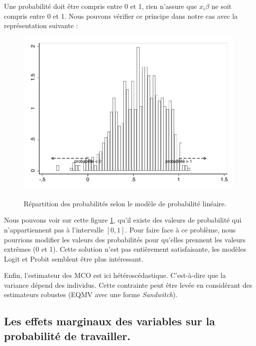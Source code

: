 Une probabilité doit être compris entre 0 et 1, rien n'assure que $x_i\beta$ ne soit compris entre 0 et 1. Nous pouvons vérifier ce principe dans notre cas avec la représentation suivante : 

\begin{figure}[h]
    \caption{Répartition des probabilités selon le modèle de probabilité linéaire.}
    \includegraphics[scale = 0.7]{101_graphics/histogram_yhat.pdf}
    \centering
    \label{fig:ProbaEntre0et1}
\end{figure}


Nous pouvons voir sur cette figure \ref{fig:ProbaEntre0et1}, qu'il existe des valeurs de probabilité qui n'appartiennent pas à l'intervalle $[0,1]$. Pour faire face à ce problème, nous pourrions modifier les valeurs des probabilités pour qu'elles prennent les valeurs extrêmes (0 et 1). Cette solution n'est pas entièrement satisfaisante, les modèles Logit et Probit semblent être plus intéressant.  

\vspace*{0.3cm}

Enfin, l’estimateur des MCO est ici hétéroscédastique. C'est-à-dire que la variance dépend des individus. Cette contrainte peut être levée en considérant des estimateurs robustes (EQMV avec une forme \emph{Sandwitch}).




\subsection{Les effets marginaux des variables sur la probabilité de travailler.}

